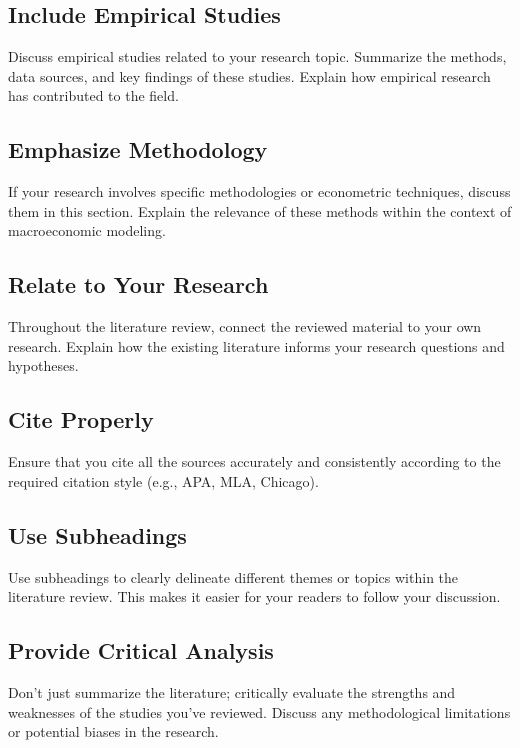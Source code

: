 \documentclass[../thesis.tex]{subfiles}
\begin{document}
	\begin{tcolorbox}[colback=red!5!white,colframe=red!75!black]
	
	\subsection*{Include Empirical Studies}
	Discuss empirical studies related to your research topic. Summarize the methods, data sources, and key findings of these studies. Explain how empirical research has contributed to the field.
	
	\subsection*{Emphasize Methodology}
	If your research involves specific methodologies or econometric techniques, discuss them in this section. Explain the relevance of these methods within the context of macroeconomic modeling.
	
	\subsection*{Relate to Your Research}
	Throughout the literature review, connect the reviewed material to your own research. Explain how the existing literature informs your research questions and hypotheses.
	
	\subsection*{Cite Properly}
	Ensure that you cite all the sources accurately and consistently according to the required citation style (e.g., APA, MLA, Chicago).
	
	\subsection*{Use Subheadings}
	Use subheadings to clearly delineate different themes or topics within the literature review. This makes it easier for your readers to follow your discussion.
	
	\subsection*{Provide Critical Analysis}
	Don't just summarize the literature; critically evaluate the strengths and weaknesses of the studies you've reviewed. Discuss any methodological limitations or potential biases in the research.

	\end{tcolorbox}
\end{document}
